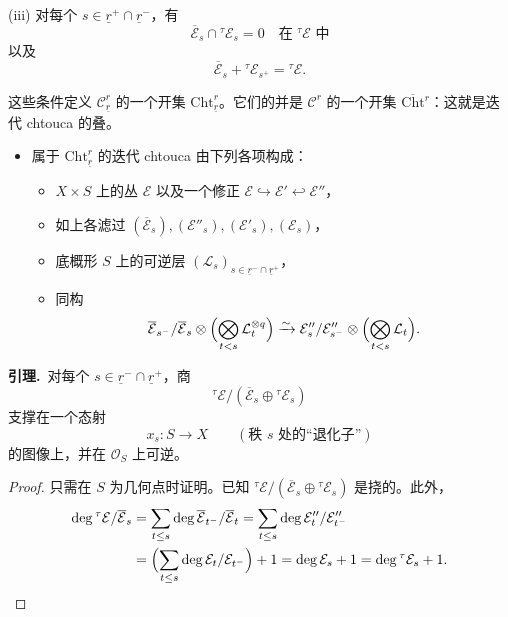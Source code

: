 (iii) 对每个 $s\in\underline{r}^+\cap\underline{r}^-$，有
\[
\overline{\mathcal{E}}_s\cap{}^\tau\mathcal{E}_s=0\quad\text{在 }{}^\tau\mathcal{E}\text{ 中}
\]
以及
\[
\overline{\mathcal{E}}_s+{}^\tau\mathcal{E}_{s^+}={}^\tau\mathcal{E}.
\]

这些条件定义 $\mathcal{C}^r_{\underline{r}}$ 的一个开集 $\mathrm{Cht}^r_{\underline{r}}$。它们的并是 $\mathcal{C}^r$ 的一个开集 $\overline{\mathrm{Cht}}{}^r$：这就是迭代 chtouca 的叠。

\begin{itemize}
\item 属于 $\mathrm{Cht}^r_{\underline{r}}$ 的迭代 chtouca 由下列各项构成：

  \begin{itemize}
  \item $X\times S$ 上的丛 $\mathcal{E}$ 以及一个修正 $\mathcal{E}\hookrightarrow\mathcal{E}'\hookleftarrow\mathcal{E}''$，
  \item 如上各滤过 $(\overline{\mathcal{E}}_s),(\mathcal{E}''_s),(\mathcal{E}'_s),(\mathcal{E}_s)$，
  \item 底概形 $S$ 上的可逆层 $(\mathcal{L}_s)_{s\in\underline{r}^-\cap\underline{r}^+}$，
  \item 同构
\[
\overline{\mathcal{E}}_{s^-}/\overline{\mathcal{E}}_s\otimes\Bigl(\bigotimes_{t<s}\mathcal{L}_t^{\otimes q}\Bigr)\xrightarrow{\sim}\mathcal{E}''_s/\mathcal{E}''_{s^-}\otimes\Bigl(\bigotimes_{t<s}\mathcal{L}_t\Bigr).
\]
  \end{itemize}
\end{itemize}

\par\medskip\noindent{}\textbf{引理.}\ 对每个 $s\in\underline{r}^-\cap\underline{r}^+$，商
\[
{}^\tau\mathcal{E}/(\overline{\mathcal{E}}_s\oplus{}^\tau\mathcal{E}_s)
\]
支撑在一个态射
\[
x_s:S\to X\qquad(\text{秩 }s\text{ 处的“退化子”})
\]
的图像上，并在 $\mathcal{O}_S$ 上可逆。

\begin{proof}
只需在 $S$ 为几何点时证明。已知 ${}^\tau\mathcal{E}/(\overline{\mathcal{E}}_s\oplus{}^\tau\mathcal{E}_s)$ 是挠的。此外，
\begin{align*}
\deg{}^\tau\mathcal{E}/\overline{\mathcal{E}}_s&=\sum_{t\le s}\deg\overline{\mathcal{E}}_{t^-}/\overline{\mathcal{E}}_t=\sum_{t\le s}\deg\mathcal{E}''_t/\mathcal{E}''_{t^-}\\
&=\Bigl(\sum_{t\le s}\deg\mathcal{E}_t/\mathcal{E}_{t^-}\Bigr)+1=\deg\mathcal{E}_s+1=\deg{}^\tau\mathcal{E}_s+1.
\end{align*}
\end{proof}

